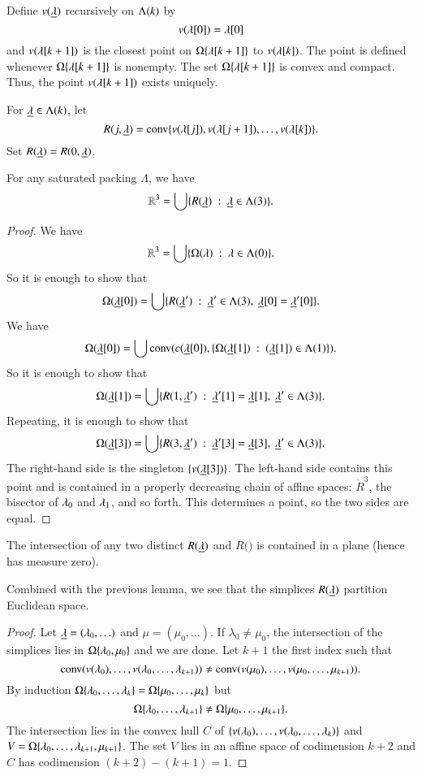 Define $v({\underline{\lambda}})$ recursively on $\Lambda(k)$ by
$$v(\lambda[0]) = \lambda[0]$$
and $v(\lambda[k+1])$ is the closest point on $\Omega\{\lambda[k+1]\}$ to $v(\lambda[k])$.  The point is defined whenever $\Omega\{\lambda[k+1]\}$ is nonempty.
The set $\Omega\{\lambda[k+1]\}$ is convex and compact.  Thus, the point $v(\lambda[k+1])$ exists
uniquely.

For ${\underline{\lambda}}\in\Lambda(k)$, let 
$$R(j,{\underline{\lambda}}) = {\operatorname{conv}}\{v(\lambda[j]), v(\lambda[j+1]),\ldots,v(\lambda[k])\}.$$  Set $R({\underline{\lambda}})=R(0,{\underline{\lambda}})$.


\begin{lemma} 
For any saturated packing $\Lambda$, we have
$$\mathbb{R}^3 = \bigcup \{ R({\underline{\lambda}}) \ :\  {\underline{\lambda}}\in \Lambda(3)\}.$$
\end{lemma}

\begin{proof}
We have $$\mathbb{R}^3 = \bigcup \{\Omega(\lambda)\ :\  \lambda\in \Lambda(0)\}.$$
So it is enough to show that
$$\Omega({\underline{\lambda}}[0]) = \bigcup \{ R({\underline{\lambda}}') \ :\  {\underline{\lambda}}'\in \Lambda(3),~{\underline{\lambda}}[0]={\underline{\lambda}}'[0]\}.$$
We have
$$\Omega({\underline{\lambda}}[0]) = \bigcup {\operatorname{conv}}(c({\underline{\lambda}}[0]),\{\Omega({\underline{\lambda}}[1])\ :\  ({\underline{\lambda}}[1])\in \Lambda(1)\}).$$
So it is enough to show that
$$\Omega({\underline{\lambda}}[1]) = \bigcup \{ R(1,{\underline{\lambda}}') \ :\  {\underline{\lambda}}'[1]={\underline{\lambda}}[1],~{\underline{\lambda}}'\in \Lambda(3)\}.$$
Repeating, it is enough to show that
$$\Omega({\underline{\lambda}}[3]) = \bigcup\{R(3,{\underline{\lambda}}')\ :\ {\underline{\lambda}}'[3]={\underline{\lambda}}[3],~{\underline{\lambda}}'\in\Lambda(3)\}.$$
The right-hand side is the singleton $\{v({\underline{\lambda}}[3])\}$.  The left-hand side
contains this point and is contained in a properly decreasing chain of affine spaces:
$\ring{R}^3$, the bisector of $\lambda_0$ and $\lambda_1$, and so forth.  This determines a point,
so the two sides are equal.
\end{proof}

\begin{lemma}  The intersection of any two distinct $R({\underline{\lambda}})$ and $R(\bm)$ is
contained in a plane (hence has measure zero).
\end{lemma}

Combined with the previous lemma, we see that the simplices $R({\underline{\lambda}})$ partition Euclidean
space.

\begin{proof}  Let ${\underline{\lambda}} = (\lambda_0,\ldots)$ and $\mu = (\mu_0,\ldots)$.
If $\lambda_0\ne\mu_0$, the intersection of the simplices lies in $\Omega\{\lambda_0,\mu_0\}$
and we are done.  Let $k+1$ the first index such that
$${\operatorname{conv}}(v(\lambda_0),\ldots,v(\lambda_0,\ldots,\lambda_{k+1}))\ne
{\operatorname{conv}}(v(\mu_0),\ldots,v(\mu_0,\ldots,\mu_{k+1})).
$$
By induction $\Omega\{\lambda_0,\ldots,\lambda_k\} = \Omega\{\mu_0,\ldots,\mu_k\}$
but
$$\Omega\{\lambda_0,\ldots,\lambda_{k+1}\} \ne \Omega\{\mu_0,\ldots,\mu_{k+1}\}.$$
The intersection lies in the convex hull $C$ of
$\{v(\lambda_0),\ldots,v(\lambda_0,\ldots,\lambda_k)\}$ and
$V=\Omega\{\lambda_0,\ldots,\lambda_{k+1},\mu_{k+1}\}$.  The set $V$ lies in an affine space of 
codimension $k+2$
and $C$ has codimension $(k+2) - (k+1) = 1$.
\end{proof}

